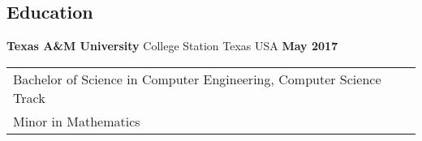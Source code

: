 \documentclass[resmargin,line,12pt]{res}
\newenvironment{list1}{
\begin{list}{\ding{113}}{%
  \setlength{\itemsep}{0in}
  \setlength{\parsep}{0in} \setlength{\parskip}{0in}
  \setlength{\topsep}{0in} \setlength{\partopsep}{0in}
  \setlength{\leftmargin}{0.17in}}}{\end{list}}
\newenvironment{list2}{
\begin{list}{$\bullet$}{%
  \setlength{\itemsep}{0in}
  \setlength{\parsep}{0in} \setlength{\parskip}{0in}
  \setlength{\topsep}{0in} \setlength{\partopsep}{0in}
  \setlength{\leftmargin}{0.2in}}}{\end{list}}
\begin{document}
{\begin{resume}
\color{black}
{\color{Black}
  \vspace{-.1in}
  \section{\sc Education}}

{\bf Texas A\&M University} College Station Texas USA \hfill {\bf May 2017} \ \\
\vspace*{-.17in}
\begin{tabular}{l l l}
  Bachelor of Science in Computer Engineering, Computer Science Track \\
  Minor in Mathematics \\
\end{tabular}





\end{resume}}
\end{document}
